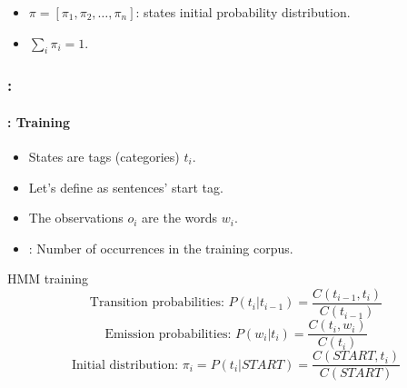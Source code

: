 \documentclass[xcolor=table]{beamer}
\begin{document}
\begin{frame}
\begin{minipage}{.45\textwidth}
	\end{minipage}
	
	\begin{itemize}
		\item $\pi = [\pi_1, \pi_2, \ldots, \pi_n ]$: states initial probability distribution.
		\item $\sum_i \pi_i = 1$.
	\end{itemize}
	
\end{frame}

\begin{frame}
	\frametitle{\insertshortsubtitle: \insertsection}
	\framesubtitle{\insertsubsection: Training}
	
	\begin{itemize}
		\item States are tags (categories) $t_i$.
		\item Let's define  as sentences' start tag.
		\item The observations $o_i$ are the words $w_i$.
		\item {}: Number of occurrences in the training corpus.
	\end{itemize}
	
	\begin{block}{HMM training}
		\[
		\text{Transition probabilities: } P(t_i | t_{i-1}) = \frac{C(t_{i-1}, t_i)}{C(t_{i-1})} 
		\]\[
		\text{Emission probabilities: } P(w_i | t_i) = \frac{C(t_i, w_i)}{C(t_i)}
		\]\[
		\text{Initial distribution: } \pi_i = P(t_i | START) = \frac{C(START, t_i)}{C(START)}
		\]
	\end{block}
\end{frame}
\end{document}
